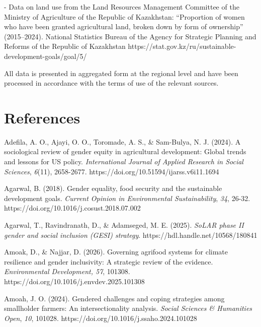 ﻿\documentclass[sn-mathphys-num]{sn-jnl}
\newcommand{\hl}[1]{#1}
\begin{document}
- Data on land use from the Land Resources Management Committee of the
Ministry of Agriculture of the Republic of Kazakhstan: ``Proportion of
women who have been granted agricultural land, broken down by form of
ownership'' (2015--2024). National Statistics Bureau of the Agency for
Strategic Planning and Reforms of the Republic of Kazakhstan
https://stat.gov.kz/ru/sustainable-development-goals/goal/5/

All data is presented in aggregated form at the regional level and have
been processed in accordance with the terms of use of the relevant
sources.

\section*{References}
\begingroup
\renewcommand{\href}[2]{#2}
\renewcommand{\url}[1]{#1}
\renewcommand{\subsection}[1]{\par\medskip\noindent\textbf{#1}\par}

\hl{Adefila, A. O., Ajayi, O. O., Toromade, A. S., \& Sam-Bulya, N. J.
(2024). A sociological review of gender equity in agricultural
development: Global trends and lessons for US policy.
\emph{International Journal of Applied Research in Social Sciences},
\emph{6}(11), 2658-2677.}
\href{https://doi.org/10.51594/ijarss.v6i11.1694}{\hl{https://doi.org/10.51594/ijarss.v6i11.1694}}

\hl{Agarwal, B. (2018). Gender equality, food security and the
sustainable development goals. \emph{Current Opinion in Environmental
Sustainability}, \emph{34}, 26-32.}
\href{https://doi.org/10.1016/j.cosust.2018.07.002}{\hl{https://doi.org/10.1016/j.cosust.2018.07.002}}

\hl{Agarwal, T., Ravindranath, D., \& Adamseged, M. E. (2025).
\emph{SoLAR phase II gender and social inclusion (GESI) strategy}.}
\href{https://hdl.handle.net/10568/180841}{\hl{https://hdl.handle.net/10568/180841}}

\hl{Amoak, D., \& Najjar, D. (2026). Governing agrifood systems for
climate resilience and gender inclusivity: A strategic review of the
evidence. \emph{Environmental Development, 57}, 101308.}
\href{https://doi.org/10.1016/j.envdev.2025.101308}{\hl{https://doi.org/10.1016/j.envdev.2025.101308}}

\hl{Amoah, J. O. (2024). Gendered challenges and coping strategies among
smallholder farmers: An intersectionality analysis. \emph{Social
Sciences \& Humanities Open}, \emph{10}, 101028.}
\href{https://doi.org/10.1016/j.ssaho.2024.101028}{\hl{https://doi.org/10.1016/j.ssaho.2024.101028}}
\end{document}
